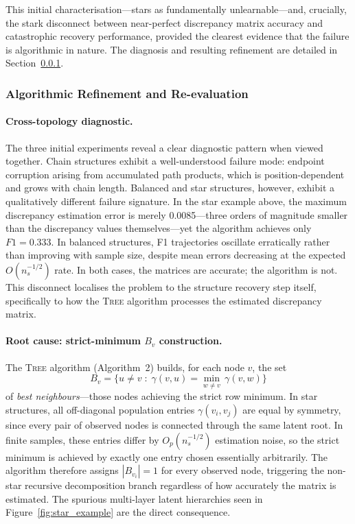 \documentclass[11pt,a4paper]{article}
\numberwithin{equation}{section}
\begin{document}
This initial characterisation---stars as fundamentally unlearnable---and, crucially, the stark disconnect between near-perfect discrepancy matrix accuracy and catastrophic recovery performance, provided the clearest evidence that the failure is algorithmic in nature.  The diagnosis and resulting refinement are detailed in Section~\ref{subsubsec:neartie_reeval}.

\subsubsection{Algorithmic Refinement and Re-evaluation}
\label{subsubsec:neartie_reeval}

\paragraph{Cross-topology diagnostic.}
The three initial experiments reveal a clear diagnostic pattern when viewed together.
Chain structures exhibit a well-understood failure mode: endpoint corruption arising
from accumulated path products, which is position-dependent and grows with chain
length.  Balanced and star structures, however, exhibit a qualitatively different
failure signature.  In the star example above, the maximum discrepancy estimation
error is merely 0.0085---three orders of magnitude smaller than the discrepancy
values themselves---yet the algorithm achieves only $F1 = 0.333$.  In balanced
structures, F1 trajectories oscillate erratically rather than improving with sample
size, despite mean errors decreasing at the expected $O(n_s^{-1/2})$ rate.  In both
cases, the matrices are accurate; the algorithm is not.  This disconnect localises
the problem to the structure recovery step itself, specifically to how the
\textsc{Tree} algorithm processes the estimated discrepancy matrix.

\paragraph{Root cause: strict-minimum $B_v$ construction.}
The \textsc{Tree} algorithm (Algorithm~2) builds, for each node $v$, the set
\[
  B_v = \bigl\{ u \neq v \;:\; \gamma(v, u) = \min_{w \neq v}\, \gamma(v, w) \bigr\}
\]
of \emph{best neighbours}---those nodes achieving the strict row minimum.  In star
structures, all off-diagonal population entries $\gamma(v_i, v_j)$ are equal by
symmetry, since every pair of observed nodes is connected through the same latent
root.  In finite samples, these entries differ by $O_p(n_s^{-1/2})$ estimation noise,
so the strict minimum is achieved by exactly one entry chosen essentially arbitrarily.
The algorithm therefore assigns $|B_{v_i}| = 1$ for every observed node, triggering
the non-star recursive decomposition branch regardless of how accurately the matrix
is estimated.  The spurious multi-layer latent hierarchies seen in
Figure~\ref{fig:star_example} are the direct consequence.
\end{document}
